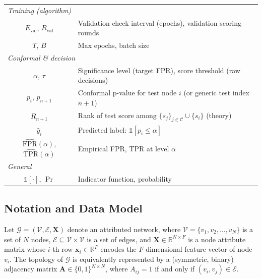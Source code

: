 \documentclass[a4paper]{cas-dc}
\theoremstyle{definition}
\begin{document}
\begin{table}[pos=t]
\begin{tabular}{@{}cl@{}}
\midrule
\multicolumn{2}{l}{\textit{Training (algorithm)}} \\
$E_{\text{val}}$, $R_{\text{val}}$ & Validation check interval (epochs), validation scoring rounds \\
$T$, $B$ & Max epochs, batch size \\
\midrule
\multicolumn{2}{l}{\textit{Conformal \& decision}} \\
$\alpha$, $\tau$ & Significance level (target FPR), score threshold (raw decisions) \\
$p_i$, $p_{n+1}$ & Conformal p-value for test node $i$ (or generic test index $n+1$) \\
$R_{n+1}$ & Rank of test score among $\{s_j\}_{j \in \mathcal{C}} \cup \{s_i\}$ (theory) \\
$\hat{y}_i$ & Predicted label: $\mathbb{1}[p_i \leq \alpha]$ \\
$\widehat{\mathrm{FPR}}(\alpha)$, $\widehat{\mathrm{TPR}}(\alpha)$ & Empirical FPR, TPR at level $\alpha$ \\
\midrule
\multicolumn{2}{l}{\textit{General}} \\
$\mathbb{1}[\cdot]$, $\Pr$ & Indicator function, probability \\
\bottomrule
\end{tabular}
\end{table}
\subsection{Notation and Data Model}
\label{sec:prob_notation}

Let $\mathcal{G} = (\mathcal{V}, \mathcal{E}, \mathbf{X})$ denote an {attributed network}, where $\mathcal{V} = \{v_1, v_2, \ldots, v_N\}$ is a set of $N$ nodes, $\mathcal{E} \subseteq \mathcal{V} \times \mathcal{V}$ is a set of edges, and $\mathbf{X} \in \mathbb{R}^{N \times F}$ is a node attribute matrix whose $i$-th row $\mathbf{x}_i \in \mathbb{R}^F$ encodes the $F$-dimensional feature vector of node $v_i$.  The topology of $\mathcal{G}$ is equivalently represented by a (symmetric, binary) adjacency matrix $\mathbf{A} \in \{0,1\}^{N \times N}$, where $A_{ij} = 1$ if and only if $(v_i, v_j) \in \mathcal{E}$.
\end{document}
